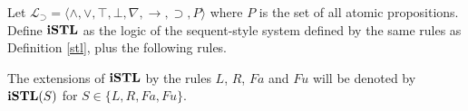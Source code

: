 \begin{dfn}\label{dfn:istl}
	Let $\mathcal{L}_\supset=\langle \wedge, \vee, \top, \bot, \nabla, \rightarrow, \supset, P \rangle$ where $P$ is the set of all atomic propositions. Define $\istl$ as the logic of the sequent-style system defined by the same rules as Definition \ref{stl}, plus the following rules.
\end{dfn}
\begin{multicols}{2}
  \begin{prooftree}
  \end{prooftree}
  \columnbreak
  \begin{prooftree}
  \end{prooftree}
\end{multicols}
The extensions of $\istl$ by the rules $L$, $R$, $Fa$ and $Fu$ will be denoted by $\istl(S)$ for $S \in \{ L, R, Fa, Fu \}$.
